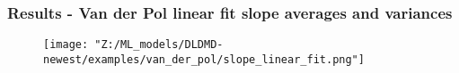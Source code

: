 \documentclass[11pt,aspectratio=169]{beamer}
\begin{document}
    \begin{frame}
        \frametitle{Results - Van der Pol linear fit slope averages and variances}
        
        \begin{figure}
            \centering
            \texttt{[image: "Z:/ML\_models/DLDMD-newest/examples/van\_der\_pol/slope\_linear\_fit.png"]}
        \end{figure}
    \end{frame}
\end{document}
